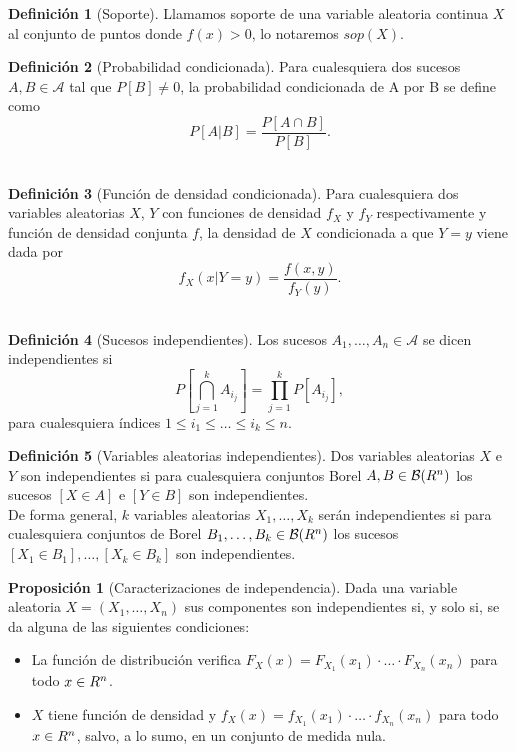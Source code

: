 \documentclass[12pt,a4paper]{report} %
\let\mathbb\relax
\theoremstyle{definition}
\newtheorem{definition}{Definición}[section]
\newtheorem{proposition}[theorem]{Proposición}
\begin{document}
\begin{definition}[Soporte]
Llamamos soporte de una variable aleatoria continua $X$ al conjunto de puntos donde $f(x)>0$, lo notaremos $sop(X)$.\\
\end{definition}


\begin{definition}[Probabilidad condicionada]
  Para cualesquiera dos sucesos $A,B \in \mathcal{A}$ tal que $P[B]\neq 0$, la probabilidad condicionada de A por B se define como\[
P[A|B] = \frac{P[A\cap B]}{P[B]}.
  \]\\[-10pt]
\end{definition}

\begin{definition}[Función de densidad condicionada]
  Para cualesquiera dos variables aleatorias $X$, $Y$ con funciones de densidad $f_X$ y $f_Y$ respectivamente y función de densidad conjunta $f$, la densidad de $X$ condicionada a que $Y=y$ viene dada por\[
f_X(x|Y=y) = \frac{f(x,y)}{f_Y(y)}.
  \]\\[-10pt]
\end{definition}

\begin{definition}[Sucesos independientes]
  Los sucesos $A_1,\dots,A_n\in \mathcal{A}$ se dicen independientes si\[
P\left [\bigcap_{j=1}^kA_{i_j} \right ] = \prod_{j=1}^kP\left [A_{i_j} \right],
\]
para cualesquiera índices $1\leq i_1\leq \dots \leq i_k\leq n$.\\
\end{definition}

\begin{definition}[Variables aleatorias independientes]
  Dos variables aleatorias $X$ e $Y$ son independientes si para cualesquiera conjuntos Borel $A, B \in \mathcal{B}(\mathbb{R}^n)$ los sucesos $[X\in A]$ e $[Y\in B]$ son independientes.\\

De forma general, $k$ variables aleatorias $X_1,\dots,X_k$ serán independientes si para cualesquiera conjuntos de Borel $B_1,\dots,B_k \in \mathcal{B}(\mathbb{R}^n)$ los sucesos $[X_1 \in B_1],\dots,[X_k\in B_k]$ son independientes.\\
\end{definition}

\begin{proposition}[Caracterizaciones de independencia]
  Dada una variable aleatoria $X =(X_1,\dots,X_n)$ sus componentes son independientes si, y solo si, se da alguna de las siguientes condiciones:
  \begin{itemize}
  \item La función de distribución verifica $F_X(x) = F_{X_1}(x_1)\cdot \ldots\cdot F_{X_n}(x_n)$ para todo $x \in \mathbb{R}^n$.
  \item $X$ tiene función de densidad y $f_X(x) = f_{X_1}(x_1)\cdot \ldots\cdot f_{X_n}(x_n)$ para todo $x \in \mathbb{R}^n$, salvo, a lo sumo, en un conjunto de medida nula.\\
  \end{itemize}
\end{proposition}
\end{document}
